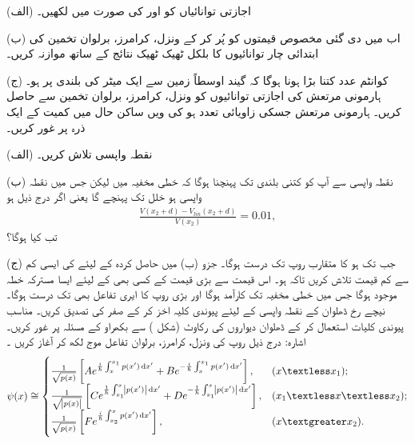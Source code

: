 (الف) اجازتی توانائیاں  کو  اور  کی صورت میں لکھیں۔

(ب) اب  میں دی گئی مخصوص قیمتوں کو پُر کر کے ونزل، کرامرز، برلوان تخمین کی ابتدائی چار توانائیوں کا بلکل ٹھیک ٹھیک نتائج کے ساتھ موازنہ کریں۔

(ج) کوانٹم عدد  کتنا بڑا ہونا ہوگا کہ گیند اوسطاً زمین سے ایک میٹر کی بلندی پر ہو۔
ہارمونی مرتعش کی اجازتی توانائیوں کو ونزل، کرامرز، برلوان تخمین سے حاصل کریں۔
ہارمونی مرتعش جسکی زاویائی تعدد  ہو کی ویں ساکن حال میں کمیت  کے ایک ذرہ پر غور کریں۔

(الف) نقطہ واپسی  تلاش کریں۔

(ب) نقطہ واپسی سے آپ کو کتنی بلندی  تک پہنچنا ہوگا کہ خطی مخفیہ  میں لیکن جس میں نقطہ واپسی  ہو خلل  تک پہنچے گا یعنی اگر درج ذیل ہو
\begin{align*}
	\frac{V(x_{2}+d)-V_{lin}(x_{2}+d)}{V(x_{2})}=\num{0.01},
\end{align*}
تب  کیا ہوگا؟

(ج) جب تک  ہو  کا متقارب روپ  تک درست ہوگا۔ جزو (ب) میں حاصل کردہ  کے لیئے  کی ایسی کم سے کم قیمت تلاش کریں تاکہ  ہو۔ اس قیمت سے بڑی قیمت کے کسی بھی   کے لیئے ایسا مسترکہ خطہ موجود ہوگا جس میں خطی مخفیہ  تک کارآمد ہوگا اور بڑی  روپ کا ایری تفاعل بھی  تک درست ہوگا۔
نیچے رخ ڈھلوان کے نقطہ واپسی کے لیئے پیوندی کلیہ اخز کر کے  صفر کی تصدیق کریں۔
مناسب پیوندی کلیات استعمال کر کے ڈھلوان  دیواروں کی رکاوٹ (شکل ) سے بکھراو کے مسئلہ پر غور کریں۔ اشارہ: درج ذیل روپ کی ونزل، کرامرز، برلوان تفاعل موج لکھ کر آغاز کریں ۔
\begin{align}
	\psi(x)\cong
	\begin{cases}
		\frac{1}{\sqrt{p(x)}}\left[A e^{\frac{i}{\hslash}\int^{x_{1}}_{x}p(x')\dif x'}+B e^{-\frac{i}{\hslash}\int^{x_{1}}_{x}p(x')\dif x'}\right],& (x \textless x_{1}); \\
		\frac{1}{\sqrt{\abs{p(x)}}}\left[C e^{\frac{1}{\hslash}\int^{x}_{x_{1}}\abs{p(x')}\dif x'}+D e^{-\frac{1}{\hslash}\int^{x}_{x_{1}}\abs{p(x')}\dif x'}\right],& (x_{1} \textless x \textless x_{2}); \\
		\frac{1}{\sqrt{p(x)}}\left[F e^{\frac{i}{\hslash}\int^{x}_{x_{2}}p(x')\dif x'}\right],& (x \textgreater x_{2}).
	\end{cases}
\end{align}

